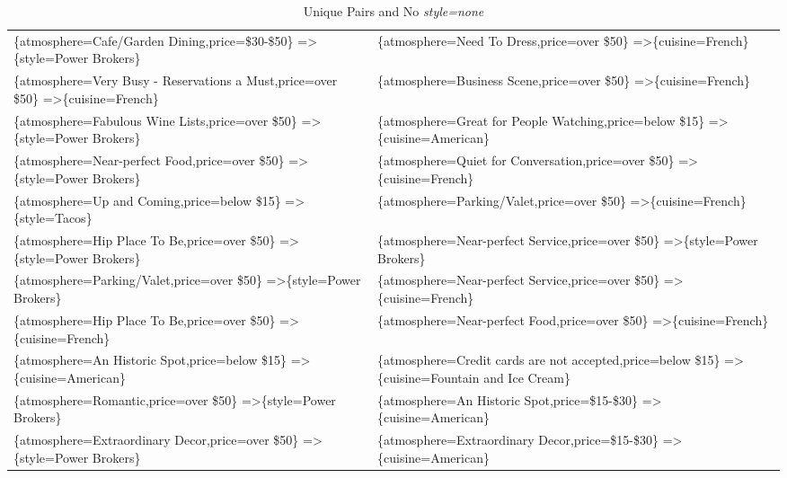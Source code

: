 \documentclass[letterpaper,10pt]{article}
\begin{document}
\begin{appendices}
\begin{table}[h]
\begin{adjustbox}{max width=\textwidth}
\begin{tabular}{ll}
\end{tabular}
\end{adjustbox}
\end{table}
\begin{table}[h]
\caption*{Unique Pairs and No \textit{style=none}}
\begin{adjustbox}{max width=\textwidth}
\begin{tabular}{ll}
\{atmosphere=Cafe/Garden Dining,price=\$30-\$50\} =\textgreater \{style=Power Brokers\} & \{atmosphere=Need To Dress,price=over \$50\} =\textgreater \{cuisine=French\} \\ 
\{atmosphere=Very Busy - Reservations a Must,price=over \$50\} =\textgreater \{cuisine=French\} & \{atmosphere=Business Scene,price=over \$50\} =\textgreater \{cuisine=French\} \\ 
\{atmosphere=Fabulous Wine Lists,price=over \$50\} =\textgreater \{style=Power Brokers\} & \{atmosphere=Great for People Watching,price=below \$15\} =\textgreater \{cuisine=American\} \\ 
\{atmosphere=Near-perfect Food,price=over \$50\} =\textgreater \{style=Power Brokers\} & \{atmosphere=Quiet for Conversation,price=over \$50\} =\textgreater \{cuisine=French\} \\ 
\{atmosphere=Up and Coming,price=below \$15\} =\textgreater \{style=Tacos\} & \{atmosphere=Parking/Valet,price=over \$50\} =\textgreater \{cuisine=French\} \\ 
\{atmosphere=Hip Place To Be,price=over \$50\} =\textgreater \{style=Power Brokers\} & \{atmosphere=Near-perfect Service,price=over \$50\} =\textgreater \{style=Power Brokers\} \\ 
\{atmosphere=Parking/Valet,price=over \$50\} =\textgreater \{style=Power Brokers\} & \{atmosphere=Near-perfect Service,price=over \$50\} =\textgreater \{cuisine=French\} \\ 
\{atmosphere=Hip Place To Be,price=over \$50\} =\textgreater \{cuisine=French\} & \{atmosphere=Near-perfect Food,price=over \$50\} =\textgreater \{cuisine=French\} \\ 
\{atmosphere=An Historic Spot,price=below \$15\} =\textgreater \{cuisine=American\} & \{atmosphere=Credit cards are not accepted,price=below \$15\} =\textgreater \{cuisine=Fountain and Ice Cream\} \\ 
\{atmosphere=Romantic,price=over \$50\} =\textgreater \{style=Power Brokers\} & \{atmosphere=An Historic Spot,price=\$15-\$30\} =\textgreater \{cuisine=American\} \\ 
\{atmosphere=Extraordinary Decor,price=over \$50\} =\textgreater \{style=Power Brokers\} & \{atmosphere=Extraordinary Decor,price=\$15-\$30\} =\textgreater \{cuisine=American\} \\ 

\end{tabular}
\end{adjustbox}
\end{table}
\end{appendices}
\end{document}
